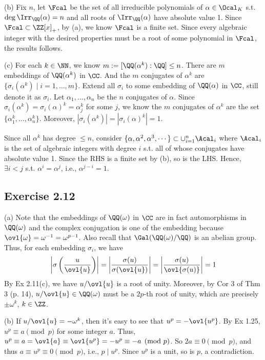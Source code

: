 \documentclass[../Chapter.tex]{subfiles}
\begin{document}
(b) Fix $n$, let $\Fcal$ be the set of all irreducible polynomials of $\alpha\in\Ocal_K$ s.t. $\deg\Irr_{\QQ}(\alpha)=n$ and all roots of $\Irr_{\QQ}(\alpha)$ have absolute value 1. Since $\Fcal\subset\ZZ[x]_+$, by (a), we know $\Fcal$ is a finite set. Since every algebraic integer with the desired properties must be a root of some polynomial in $\Fcal$, the results follows.

(c) For each $k\in\NN$, we know $m:=[\QQ(\alpha^k):\QQ] \leq n$. There are $m$ embeddings of $\QQ(\alpha^k)$ in $\CC$. And the $m$ conjugates of $\alpha^k$ are $\{\sigma_i(\alpha^k)\mid i=1,\ldots,m\}$. Extend all $\sigma_i$ to some embedding of $\QQ(\alpha)$ in $\CC$, still denote it as $\sigma_i$. Let $\alpha_1,\ldots,\alpha_n$ be the $n$ conjugates of $\alpha$. Since $\sigma_i(\alpha^k)=\sigma_i(\alpha)^k=\alpha_j^k$ for some $j$, we know the $m$ conjugates of $\alpha^k$ are the set $\{\alpha_1^k,\ldots,\alpha_n^k\}$. Moreover, $|\sigma_i(\alpha^k)|=|\sigma_i(\alpha)^k|=1$.

Since all $\alpha^k$ has degree $\leq n$, consider $\{\alpha,\alpha^2,\alpha^3,\cdots\} \subset \cup_{i=1}^n \Acal_i$ where $\Acal_i$ is the set of algebraic integers with degree $i$ s.t. all of whose conjugates have absolute value 1. Since the RHS is a finite set by (b), so is the LHS. Hence, $\exists i< j$ s.t. $\alpha^i=\alpha^j$, i.e., $\alpha^{j-i}=1$.

\subsection*{Exercise 2.12}

(a) Note that the embeddings of $\QQ(\omega)$ in $\CC$ are in fact automorphisms in $\QQ(\omega)$ and the complex conjugation is one of the embedding because $\ovl{\omega}=\omega^{-1}=\omega^{p-1}$. Also recall that $\Gal(\QQ(\omega)/\QQ)$ is an abelian group. Thus, for each embedding $\sigma_i$, we have $$\left|\sigma\left(\frac{u}{\ovl{u}}\right)\right| = \left|\frac{\sigma(u)}{\sigma(\ovl{u})}\right| = \left|\frac{\sigma(u)}{\ovl{\sigma(u)}}\right| = 1$$ By Ex 2.11(c), we have $u/\ovl{u}$ is a root of unity. Moreover, by Cor 3 of Thm 3 (p. 14), $u/\ovl{u}\in\QQ(\omega)$ must be a $2p$-th root of unity, which are precisely $\pm \omega^k$, $k\in\ZZ$.

(b) If $u/\ovl{u}=-\omega^k$, then it's easy to see that $u^p=-\ovl{u^p}$. By Ex 1.25, $u^p\equiv a \pmod{p}$ for some integer $a$. Thus, $u^p \equiv a = \ovl{a} \equiv \ovl{u^p} = -u^p \equiv -a \pmod{p}$. So $2a\equiv 0 \pmod{p}$, and thus $a\equiv u^p \equiv0 \pmod{p}$, i.e., $p\mid u^p$. Since $u^p$ is a unit, so is $p$, a contradiction.
\end{document}

